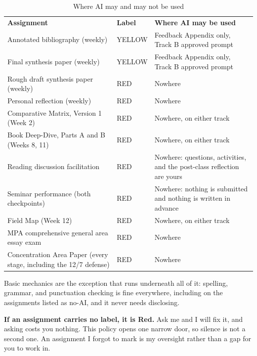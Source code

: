 \documentclass[11pt]{article}     %
\begin{document}
\begin{center}
\begin{table}[h]
    \caption{Where AI may and may not be used}
    \label{tab:ai-where}
    \centering
    \begin{tabularx}{\linewidth}{L l L}
    \textbf{Assignment} & \textbf{Label} & \textbf{Where AI may be used} \\
Annotated bibliography (weekly) & YELLOW & Feedback Appendix only, Track B approved prompt \\
Final synthesis paper (weekly) & YELLOW & Feedback Appendix only, Track B approved prompt \\
Rough draft synthesis paper (weekly) & RED & Nowhere \\
Personal reflection (weekly) & RED & Nowhere \\
Comparative Matrix, Version 1 (Week 2) & RED & Nowhere, on either track \\
Book Deep-Dive, Parts A and B (Weeks 8, 11) & RED & Nowhere, on either track \\
Reading discussion facilitation & RED & Nowhere: questions, activities, and the post-class reflection are yours \\
Seminar performance (both checkpoints) & RED & Nowhere: nothing is submitted and nothing is written in advance \\
Field Map (Week 12) & RED & Nowhere, on either track \\
MPA comprehensive general area essay exam & RED & Nowhere \\
Concentration Area Paper (every stage, including the 12/7 defense) & RED & Nowhere \\
    \end{tabularx}
\end{table}
\end{center}

\noindent Basic mechanics are the exception that runs underneath all of it: spelling, grammar, and punctuation checking is fine everywhere, including on the assignments listed as no-AI, and it never needs disclosing.

\vspace{0.5em}
\noindent \textbf{If an assignment carries no label, it is Red.} Ask me and I will fix it, and asking costs you nothing. This policy opens one narrow door, so silence is not a second one. An assignment I forgot to mark is my oversight rather than a gap for you to work in.
\end{document}
